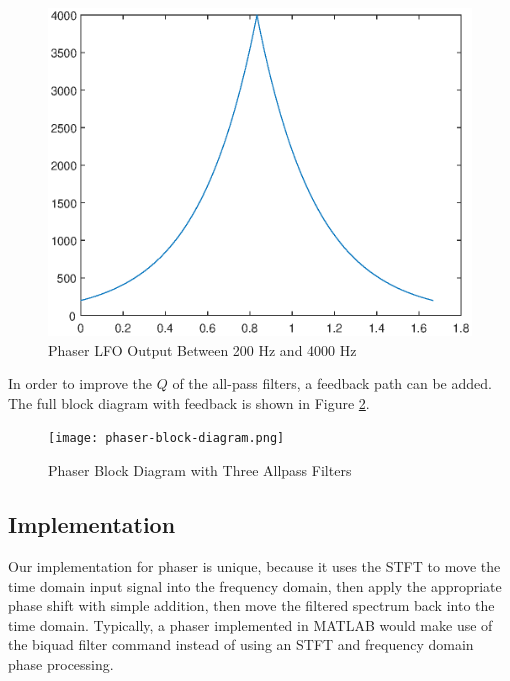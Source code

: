 \begin{figure}[ht]
    \centering
    \includegraphics[scale=0.5]{phaser-lfo-waveform.eps}
    \caption{Phaser LFO Output Between 200 Hz and 4000 Hz}
    \label{fig:phaser-lfo-waveform}
\end{figure}
In order to improve the $Q$ of the all-pass filters, a feedback path can be added. The full block diagram with feedback is shown in Figure \ref{fig:phaser-block-diagram}.
\begin{figure}[ht]
    \centering
    \texttt{[image: phaser-block-diagram.png]}
    \caption{Phaser Block Diagram with Three Allpass Filters}
    \label{fig:phaser-block-diagram}
\end{figure}

\subsection{Implementation}
Our implementation for phaser is unique, because it uses the STFT to move the time domain input signal into the frequency domain, then apply the appropriate phase shift with simple addition, then move the filtered spectrum back into the time domain. Typically, a phaser implemented in MATLAB would make use of the biquad filter command instead of using an STFT and frequency domain phase processing.

